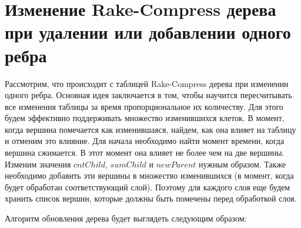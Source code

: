 \FloatBarrier
\section{Изменение Rake-Compress дерева при удалении или добавлении одного ребра}   

Рассмотрим, что происходит с таблицей Rake-Compress дерева при изменении одного ребра.
Основная идея заключается в том, чтобы научится пересчитывать все изменения таблицы за время пропорциональное их количеству.
Для этого будем эффективно поддерживать множество изменившихся клеток. 
В момент, когда вершина помечается как изменившаяся, найдем, как она влияет на таблицу и отменим это влияние. 
Для начала необходимо найти момент времени, когда вершина сжимается. В этот момент она влияет не более чем на две вершины. 
Изменим значения $cntChild$, $sumChild$ и $newParent$ нужным образом. 
Также необходимо добавить эти вершины в множество изменившихся (в момент, когда будет обработан соответствующий слой).
Поэтому для каждого слоя еще будем хранить список вершин, которые должны быть помечены перед обработкой слоя.

Алгоритм обновления дерева будет выглядеть следующим образом:


